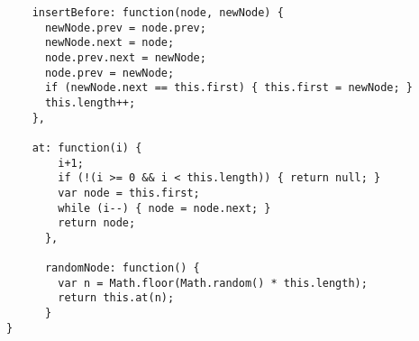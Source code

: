 \begin{verbatim}
    insertBefore: function(node, newNode) {
      newNode.prev = node.prev;
      newNode.next = node;
      node.prev.next = newNode;
      node.prev = newNode;
      if (newNode.next == this.first) { this.first = newNode; }
      this.length++;
    },

    at: function(i) {
        i+1;
        if (!(i >= 0 && i < this.length)) { return null; }
        var node = this.first;
        while (i--) { node = node.next; }
        return node;
      },

      randomNode: function() {
        var n = Math.floor(Math.random() * this.length);
        return this.at(n);
      } 
}   
\end{verbatim}

% 
% 
% 
% 
